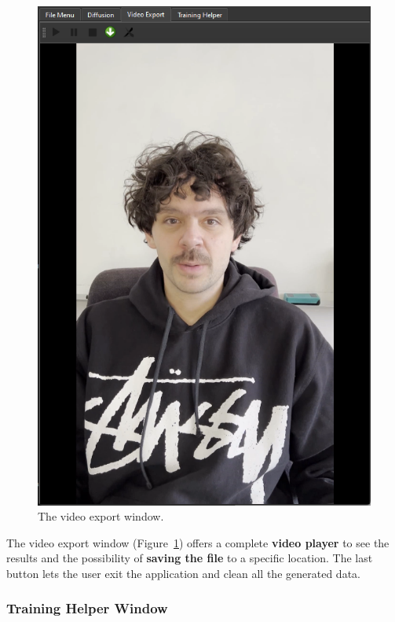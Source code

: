 \documentclass[preprint]{elsarticle}
\begin{document}
\begin{figure}[H]
	\centering
	\includegraphics[scale=0.5, keepaspectratio]{img/project_img/video-window.png}
	\caption{The video export window.}
	\label{fig:video-player}
\end{figure}

The video export window (Figure~\ref{fig:video-player}) offers a complete \textbf{video player} 
to see the results and the possibility of \textbf{saving the file} to a specific location. 
The last button lets the user exit the application and clean all the generated data.


\subsubsection{Training Helper Window}
\end{document}
